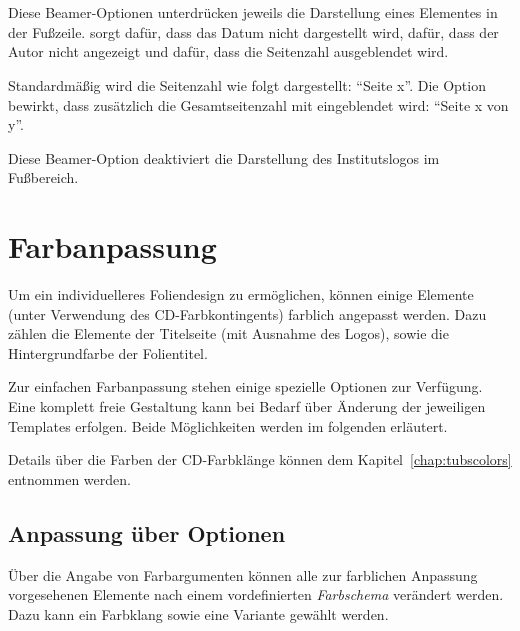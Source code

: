 \begin{Declaration}
  \\
  \\
\end{Declaration}

Diese Beamer-Optionen unterdrücken jeweils die Darstellung eines Elementes in der Fußzeile.
 sorgt dafür, dass das Datum nicht dargestellt wird,
 dafür, dass der Autor nicht angezeigt und
 dafür, dass die Seitenzahl ausgeblendet wird.

\begin{Declaration}
\end{Declaration}

Standardmäßig wird die Seitenzahl wie folgt dargestellt: "`Seite x"'.
Die Option  bewirkt, dass zusätzlich die Gesamtseitenzahl
mit eingeblendet wird: "`Seite x von y"'.

\begin{Declaration}
\end{Declaration}

Diese Beamer-Option deaktiviert die Darstellung des Institutslogos im Fußbereich.



\section{Farbanpassung}\label{beamer:sec:color}

Um ein individuelleres Foliendesign zu ermöglichen, können einige Elemente
(unter Verwendung des CD-Farbkontingents)
farblich angepasst werden.
Dazu zählen die Elemente der Titelseite (mit Ausnahme des Logos),
sowie die Hintergrundfarbe der Folientitel.

Zur einfachen Farbanpassung stehen einige spezielle Optionen zur Verfügung.
Eine komplett freie Gestaltung kann bei Bedarf über Änderung der
jeweiligen Templates erfolgen. Beide Möglichkeiten werden im folgenden
erläutert.

Details über die Farben der CD-Farbklänge können dem
Kapitel~\ref{chap:tubscolors} entnommen werden.

\subsection{Anpassung über Optionen}

Über die Angabe von Farbargumenten können alle zur farblichen Anpassung
vorgesehenen Elemente nach einem vordefinierten \emph{Farbschema}
verändert werden.
Dazu kann ein Farbklang sowie eine Variante gewählt werden.

